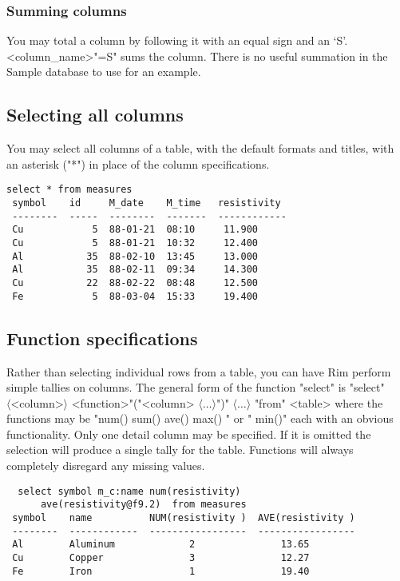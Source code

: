 \documentclass[11pt,a4paper]{report}
\def\opt#1{$\langle \mbox{#1} \rangle$}
\def\I{\index}
\begin{document}
\subsubsection{Summing columns}
\I{sum}
You may total a column by following it with an equal sign and an `S'.
<column\_name>"=S"
sums the column.
There is no useful summation in the Sample database
to use for an example.
 
\subsection{Selecting all columns}
\I{*}
You may select all columns of a table, with the default formats
and titles, with an asterisk ("*") in place of the column specifications.
\begin{verbatim}
select * from measures
 symbol    id     M_date    M_time   resistivity
 --------  -----  --------  -------  ------------
 Cu            5  88-01-21  08:10     11.900
 Cu            5  88-01-21  10:32     12.400
 Al           35  88-02-10  13:45     13.000
 Al           35  88-02-11  09:34     14.300
 Cu           22  88-02-22  08:48     12.500
 Fe            5  88-03-04  15:33     19.400
\end{verbatim}
 
\subsection{Function specifications}
\I{functions}
Rather than selecting individual rows from a table, you can
have Rim perform simple tallies on columns.
The general form of the function "select" is
"select" \opt{<column>} <function>"("<column> \opt{\ldots}")"
   \opt{\ldots} "from" <table>
where the functions may be
"num()  sum()  ave()  max()  " or " min()"
each with an obvious functionality.
Only one detail column may be specified.  If it is omitted
the selection will produce a single tally for the table.
Functions will always completely disregard any missing values.

\begin{verbatim}
  select symbol m_c:name num(resistivity)
      ave(resistivity@f9.2)  from measures
 symbol    name          NUM(resistivity )  AVE(resistivity )
 --------  ------------  -----------------  -----------------
 Al        Aluminum             2               13.65
 Cu        Copper               3               12.27
 Fe        Iron                 1               19.40
\end{verbatim}
 
\end{document}
